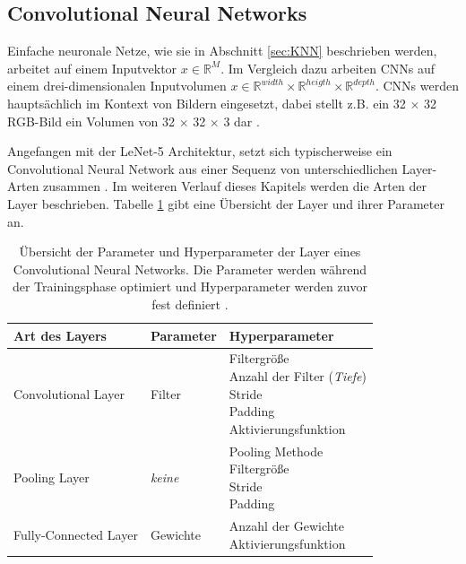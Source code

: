 \subsection{Convolutional Neural Networks}
\label{sec:CNN}
Einfache neuronale Netze, wie sie in Abschnitt \ref{sec:KNN} beschrieben werden, arbeitet auf einem Inputvektor $x \in \mathbb{R}^{M}$. Im Vergleich dazu arbeiten CNNs auf einem drei-dimensionalen Inputvolumen $x \in \mathbb{R}^{width} \times \mathbb{R}^{heigth} \times \mathbb{R}^{depth}$. CNNs werden hauptsächlich im Kontext von Bildern eingesetzt, dabei stellt z.B. ein 32 $\times$ 32 RGB-Bild ein Volumen von 32 $\times$ 32 $\times$ 3 dar \cite{CS231nConvolutionalNeurala}.

Angefangen mit der LeNet-5 \cite{lecunGradientBasedLearningApplied1998} Architektur, setzt sich typischerweise ein Convolutional Neural Network aus einer Sequenz von unterschiedlichen Layer-Arten zusammen \cite{szegedyGoingDeeperConvolutions2015, CS231nConvolutionalNeurala}. Im weiteren Verlauf dieses Kapitels werden die Arten der Layer beschrieben. Tabelle \ref{tab:layer_param} gibt eine Übersicht der Layer und ihrer Parameter an.
\vspace*{\fill}
\begin{table}[H]
	\centering
	\caption{Übersicht der Parameter und Hyperparameter der Layer eines Convolutional Neural Networks. Die Parameter werden während der Trainingsphase optimiert und Hyperparameter werden zuvor fest definiert \cite{yamashitaConvolutionalNeuralNetworks2018}. }
	\begin{tabularx}{1.0\textwidth}{X X X}
		\textbf{Art des Layers} & \textbf{Parameter} & \textbf{Hyperparameter}\\
		\hline
		Convolutional Layer & Filter & \makecell[tl]{
			Filtergröße\\
			Anzahl der Filter (\textit{Tiefe})\\
			Stride\\
			Padding\\
			Aktivierungsfunktion
		}\\
		\hline
		Pooling Layer &  \textit{keine}  & \makecell[tl]{
			Pooling Methode\\
			Filtergröße\\
			Stride\\
			Padding
		}\\
		\hline
		Fully-Connected Layer & Gewichte & \makecell[tl]{
			Anzahl der Gewichte\\
			Aktivierungsfunktion
		}\\
		\hline
	\end{tabularx}
	\label{tab:layer_param}
\end{table}
\vspace*{\fill}
\pagebreak
